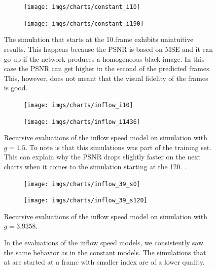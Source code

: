 \documentclass{llncs}
\begin{document}
\begin{figure}[H]
  \vspace*{-4cm}
  \begin{subfigure}{.5\textwidth}
    \centering
    \texttt{[image: imgs/charts/constant\_i10]}
  \end{subfigure}
  \begin{subfigure}{.5\textwidth}
    \centering
    \texttt{[image: imgs/charts/constant\_i190]}
  \end{subfigure}  
  \caption{The simulation that starts at the 10.\@ frame exhibits unintuitive results. This happens because the PSNR is based on MSE and it can go up if the network produces a homogeneous black image. In this case the PSNR can get higher in the second of the predicted frames. This, however, does not meant that the visual fidelity of the frames is good.}\label{fig:rec_const_psnr}
\end{figure}
\vspace*{-1cm}
\begin{figure}[H]
  \begin{subfigure}{.5\textwidth}
    \centering
    \texttt{[image: imgs/charts/inflow\_i10]}
  \end{subfigure}
  \begin{subfigure}{.5\textwidth}
    \centering
    \texttt{[image: imgs/charts/inflow\_i1436]}
  \end{subfigure}
  \begin{center}
    Recursive evaluations of the inflow speed model on simulation with $g=1.5$. To note is that this simulations was part of the training set. This can explain why the PSNR drops slightly faster on the next charts when it comes to the simulation starting at the 120. \@frame.
  \end{center}
  \begin{subfigure}{.5\textwidth}
    \centering
    \texttt{[image: imgs/charts/inflow\_39\_s0]}
  \end{subfigure}
  \begin{subfigure}{.5\textwidth}
    \centering
    \texttt{[image: imgs/charts/inflow\_39\_s120]}
  \end{subfigure}
  \begin{center}
    Recursive evaluations of the inflow speed model on simulation with $g=3.9358$.
  \end{center}
  \caption{In the evaluations of the inflow speed models, we consistently saw the same behavior as in the constant models. The simulations that at are started at a frame with smaller index are of a lower quality.}\label{fig:rec_speed_psnr}
\end{figure}
\end{document}
